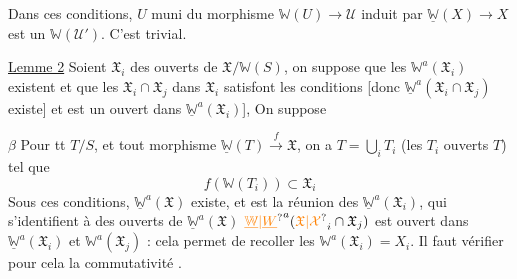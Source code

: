Dans ces conditions, $U$ muni du morphisme $\mathbb W(U)\longrightarrow\mathcal U$ induit par $\underline{\mathbb W}(X)\to X$ est un $\mathbb W(\mathcal U')$.
C'est trivial. 


\uline{Lemme 2} Soient $\mathfrak X_i$ des ouverts de $\mathfrak X/\mathbb W(S)$, on suppose  que  les $\mathbb W^a(\mathfrak X_i)$ existent   et que les $\mathfrak X_i\cap\mathfrak X_j$ dans $\mathfrak X_i$ satisfont les  conditions  [donc $\underline{\mathbb W}^a(\mathfrak X_i\cap\mathfrak X_j)$ existe] et est un ouvert dans $\underline{\mathbb W}^a(\mathfrak X_i)$],  On suppose

\textcircled{$\beta$} Pour tt $T/S$, et tout morphisme $\underline{\mathbb W}(T)\xrightarrow f\mathfrak X$, on a $T=\bigcup_i T_i$ (les $T_i$ ouverts  $T$) tel que
\[
 f(\mathbb W(T_i))\subset\mathfrak X_i
\]
Sous ces conditions, $\underline{\mathbb W}^a(\mathfrak X)$ existe, et est la réunion des $\underline{\mathbb W}^a(\mathfrak X_i)$, qui s'identifient à des ouverts de $\underline{\mathbb W}^a(\mathfrak X)$
$\unsure{\underline{\mathbb W}|\underline W}^a(\unsure{\mathfrak X|\mathcal X}_i\cap\mathfrak X_j)$ est   ouvert   dans $\underline{\mathbb W}^a(\mathfrak X_i)$ et  $\mathbb W^a(\mathfrak X_j)$ : cela permet de recoller les $\mathbb W^a(\mathfrak X_i)=X_i$. Il faut vérifier pour cela la  commutativité .


